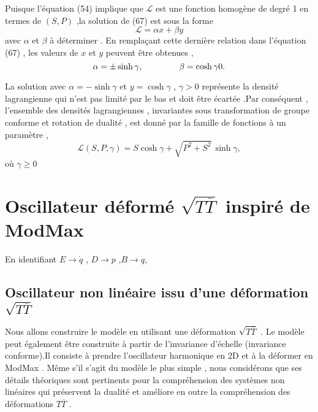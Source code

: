 \documentclass[12pt,a4paper, openany]{article}
\begin{document}
Puisque l'équation (54) implique que $\mathcal{L}$ est une fonction homogène de degré 1 en termes de $(S,P)$ ,la solution de (67) est sous la forme 
\begin{equation}
\mathcal{L}=\alpha x +\beta y	
\end{equation}
avec $\alpha$ et $\beta$ à déterminer . En remplaçant cette dernière relation dans l'équation (67) , les valeurs de $x$ et $y$ peuvent \^{e}tre obtenues ,
\begin{equation}
	\alpha=\pm \sinh{\gamma} , \hspace{1.5cm} \beta=\cosh{\gamma} 0.
\end{equation} 

La solution avec $\alpha=-\sinh{\gamma}$ et $y=\cosh{\gamma}$ , $\gamma>0$ représente la densité lagrangienne qui n'est pas limité par le bas et doit \^{e}tre écartée .Par conséquent , l'ensemble des densités lagrangiennes , invariantes sous transformation de groupe conforme et rotation de dualité , est donné par la famille de fonctions à un paramètre ,
\begin{equation}
	\mathcal{L}(S,P, \gamma)=S \cosh{\gamma}+\sqrt{P^2+ S^2}\, \sinh{\gamma},
\end{equation}
où $\gamma\geq 0$
 





	

 
\newpage
\section{Oscillateur déformé  $\sqrt{T{\overline{T}}}$ inspiré de ModMax}
En identifiant $E\rightarrow{\dot{q}}$ , $D\rightarrow{p}$ ,$B\rightarrow{q}$,
\subsection{Oscillateur non linéaire issu d'une déformation $\sqrt{T{\overline{T}}}$}
\hspace{0.5cm} Nous allons construire le modèle en utilisant une déformation $\sqrt{T{\overline{T}}}$ . Le modèle peut également \^{e}tre construite à partir de l'invariance d'échelle (invariance conforme).Il consiste à prendre l'oscillateur harmonique  en 2D et à la déformer en ModMax . M\^{e}me s'il s'agit du modèle le plus simple , nous considérons que ses détails théoriques sont pertinents pour la compréhension des systèmes non linéaires qui préservent la dualité et améliore en outre la compréhension des déformations $T{\overline{T}}$ . 
\end{document}
